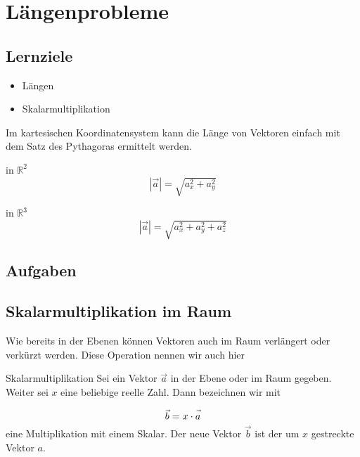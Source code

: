 \section{Längenprobleme}

\subsection*{Lernziele}
\begin{itemize}
\item Längen
\item Skalarmultiplikation
\end{itemize}

Im kartesischen Koordinatensystem kann die Länge von Vektoren einfach
mit dem Satz des Pythagoras ermittelt werden.

\begin{gesetz}{in $\mathbb{R}^2$}{}
  $$|\vec{a}| = \sqrt{a_x^2 + a_y^2}$$
\end{gesetz}

\begin{gesetz}{in $\mathbb{R}^3$}{}
  $$|\vec{a}| = \sqrt{a_x^2 + a_y^2 + a_z^2}$$
\end{gesetz}


\subsection*{Aufgaben}

\newpage


\subsection{Skalarmultiplikation im Raum}
Wie bereits in der Ebenen können Vektoren auch im Raum verlängert oder
verkürzt werden. Diese Operation nennen wir auch hier 

\begin{definition}{Skalarmultiplikation}{}
  Sei ein Vektor $\vec{a}$ in der Ebene oder im Raum gegeben. Weiter
  sei $x$ eine beliebige reelle Zahl. Dann bezeichnen wir mit
  
  $$\vec{b} = x \cdot{} \vec{\vphantom{b}a}$$
  eine Multiplikation mit einem Skalar. Der neue Vektor $\vec{b}$ ist
  der um $x$ gestreckte Vektor $a$. 
\end{definition}

